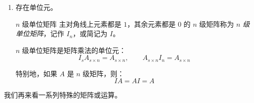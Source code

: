 \begin{enumerate}
	\item 存在单位元。

	\begin{definition}{$n$ 级单位矩阵}
		主对角线上元素都是 $1$，其余元素都是 $0$ 的 $n$ 级矩阵称为 \emph{$n$ 级单位矩阵}，记作 $I_n$，或简记为 $I$。
	\end{definition}

	\begin{theorem}
		$n$ 级单位矩阵是矩阵乘法的单位元：
		$$
		I_s A_{s \times n} = A_{s \times n}, \qquad A_{s \times n} I_n = A_{s \times n}
		$$

		特别地，如果 $A$ 是 $n$ 级矩阵，则：
		$$
		IA = AI = A
		$$
	\end{theorem}

\end{enumerate}

我们再来看一系列特殊的矩阵或运算。


